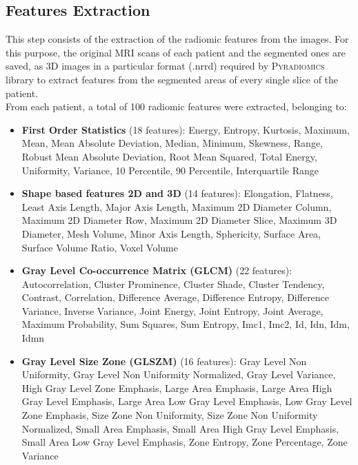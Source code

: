 \documentclass{standalone}
\begin{document}
\subsection{Features Extraction}

This step consists of the extraction of the radiomic features from the images.
For this purpose, the original MRI scans of each patient and the segmented ones are saved, as 3D images in a particular format (.nrrd) required by \textsc{Pyradiomics} library \cite{Pyradiomics} to extract features from the segmented areas of every single slice of the patient. 
\\
From each patient, a total of 100 radiomic features were extracted, belonging to:
\begin{itemize}
    \item \textbf{First Order Statistics} (18 features): Energy, Entropy, Kurtosis, Maximum, Mean, Mean Absolute Deviation, Median, Minimum, Skewness, Range, Robust Mean Absolute Deviation, Root Mean Squared, Total Energy, Uniformity, Variance, 10 Percentile, 90 Percentile, Interquartile Range
    
    \item \textbf{Shape based features 2D and 3D} (14 features): Elongation, Flatness, Least Axis Length, Major Axis Length, Maximum 2D Diameter Column, Maximum 2D Diameter Row, Maximum 2D Diameter Slice, Maximum 3D Diameter, Mesh Volume, Minor Axis Length, Sphericity, Surface Area, Surface Volume Ratio, Voxel Volume
    
    \item \textbf{Gray Level Co-occurrence Matrix (GLCM)} (22 features): Autocorrelation, Cluster Prominence, Cluster Shade, Cluster Tendency, Contrast, Correlation, Difference Average, Difference Entropy, Difference Variance, Inverse Variance, Joint Energy, Joint Entropy, Joint Average, Maximum Probability, Sum Squares, Sum Entropy, Imc1, Imc2, Id, Idn, Idm, Idmn
    
    \item \textbf{Gray Level Size Zone (GLSZM)} (16 features): Gray Level Non Uniformity, Gray Level Non Uniformity Normalized, Gray Level Variance, High Gray Level Zone Emphasis, Large Area Emphasis, Large Area High Gray Level Emphasis, Large Area Low Gray Level Emphasis, Low Gray Level Zone Emphasis, Size Zone Non Uniformity, Size Zone Non Uniformity Normalized, Small Area Emphasis, Small Area High Gray Level Emphasis, Small Area Low Gray Level Emphasis, Zone Entropy, Zone Percentage, Zone Variance
    

\end{itemize}
\end{document}
